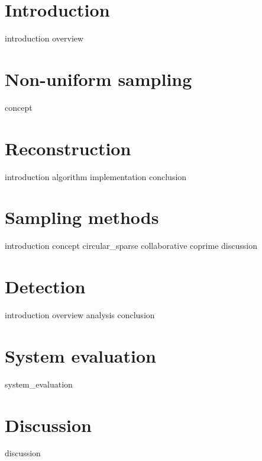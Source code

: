 \documentclass[a4paper, openany, oneside]{memoir}
\begin{document}
\chapter{Introduction}
\label{cha:overview}
{introduction}
{overview}

\chapter{Non-uniform sampling}
\label{cha:sampling}
{concept}

\chapter{Reconstruction}
\label{cha:reconstruction}
{introduction}
{algorithm}
{implementation}
{conclusion}

\chapter{Sampling methods}
\label{cha:sampling_methods}
{introduction}
{concept}
{circular_sparse}
{collaborative}
{coprime}
{discussion}

\chapter{Detection}
\label{cha:detection}
{introduction}
{overview}
{analysis}
{conclusion}

\chapter{System evaluation}
\label{cha:system_evaluation_theory}
{system_evaluation}

\chapter{Discussion}
\label{cha:discussion_theory}
{discussion}
\end{document}
